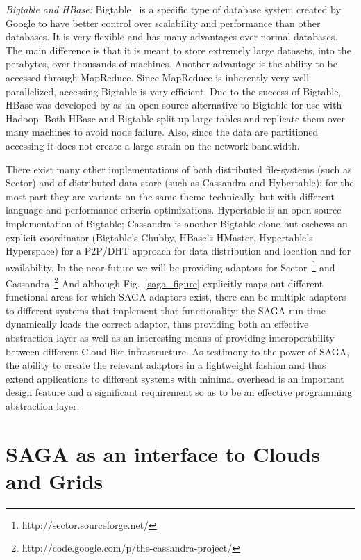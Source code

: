 \documentclass[conference,final]{IEEEtran}
\newcommand{\jhanote}[1]{ {\textcolor{red} { ***SJ: #1 }}}
\newcommand{\jhanote}[1]{}
\begin{document}
{\it Bigtable and HBase:} Bigtable~\cite{bigtable_small} is a specific
type of database system created by Google to have better control over
scalability and performance than other databases.  It is very flexible
and has many advantages over normal databases.  The main difference is
that it is meant to store extremely large datasets, into the
petabytes, over thousands of machines.  Another advantage is the
ability to be accessed through MapReduce.  Since MapReduce is
inherently very well parallelized, accessing Bigtable is very
efficient.  Due to the success of Bigtable, HBase was developed by as
an open source alternative to Bigtable for use with Hadoop.  Both
HBase and Bigtable split up large tables and replicate them over many
machines to avoid node failure.  Also, since the data are partitioned
accessing it does not create a large strain on the network bandwidth.

There exist many other implementations of both distributed
file-systems (such as Sector) and of distributed data-store (such as
Cassandra and Hybertable); for the most part they are variants on the
same theme technically, but with different language and performance
criteria optimizations.  Hypertable is an open-source implementation
of Bigtable; Cassandra is another Bigtable clone but eschews an
explicit coordinator (Bigtable's Chubby, HBase's HMaster, Hypertable's
Hyperspace) for a P2P/DHT approach for data distribution and location
and for availability.  In the near future we will be providing
adaptors for Sector~\footnote{http://sector.sourceforge.net/} and
Cassandra~\footnote{http://code.google.com/p/the-cassandra-project/}
And although Fig.~\ref{saga_figure} explicitly maps out different
functional areas for which SAGA adaptors exist, there can be multiple
adaptors to different systems that implement that functionality; the
SAGA run-time dynamically loads the correct adaptor, thus providing
both an effective abstraction layer as well as an interesting means of
providing interoperability between different Cloud like
infrastructure.  As testimony to the power of SAGA, the ability to
create the relevant adaptors in a lightweight fashion and thus extend
applications to different systems with minimal overhead is an
important design feature and a significant requirement so as to be an
effective programming abstraction layer.


\section{SAGA as an interface to Clouds and Grids}
\end{document}

